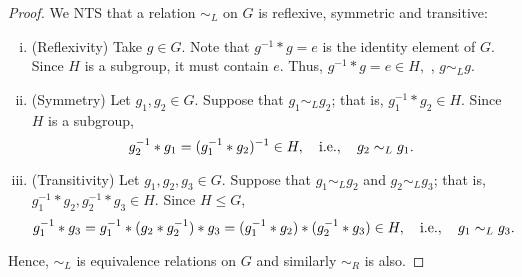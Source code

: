 \documentclass[11pt,openany]{article}
\begin{document}
\newpage
{}
\begin{proof}	
	We NTS that a relation $\sim_L$ on $G$ is reflexive, symmetric and transitive: \begin{enumerate}[(i)]
		\item (Reflexivity)\; Take $g\in G$. Note that $g^{-1}\ast g=e$ is the identity element of $G$. Since $H$ is a subgroup, it must contain $e$. Thus, $g^{-1}\ast g=e\in H,$ \ie, $g\sim_L g$.
		\item (Symmetry)\; Let $g_1,g_2\in G$. Suppose that $g_1\sim_L g_2$; that is, $g_1^{-1}\ast g_2\in H$. Since $H$ is a subgroup, \[
		g_2^{-1}\ast g_1=(g_1^{-1}\ast g_2)^{-1}\in H,\quad\textnormal{i.e.},\quad g_2\sim_L g_1.
		\] 
		\item (Transitivity)\; Let $g_1,g_2,g_3\in G$. Suppose that $g_1\sim_L g_2$ and $g_2\sim_L g_3$; that is, $g_1^{-1}\ast g_2,g_2^{-1}\ast g_3\in H$. Since $H\leq G$, \[
		g_1^{-1}\ast g_3=g_1^{-1}\ast (g_2\ast g_2^{-1})\ast g_3=(g_1^{-1}\ast g_2)\ast (g_2^{-1}\ast g_3)\in H,\quad\textnormal{i.e.},\quad g_1\sim_L g_3.
		\]
	\end{enumerate} Hence, $\sim_L$ is equivalence relations on $G$ and similarly $\sim_R$ is also.
\end{proof}
\vfill
{}
\end{document}
